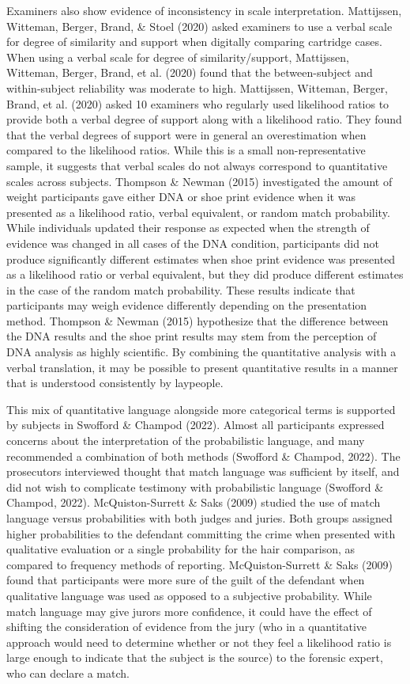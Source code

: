 \documentclass[print]{nuthesis}
\begin{document}
Examiners also show evidence of inconsistency in scale interpretation.
Mattijssen, Witteman, Berger, Brand, \& Stoel (2020) asked examiners to use a verbal scale for degree of similarity and support when digitally comparing cartridge cases.
When using a verbal scale for degree of similarity/support, Mattijssen, Witteman, Berger, Brand, et al. (2020) found that the between-subject and within-subject reliability was moderate to high.
Mattijssen, Witteman, Berger, Brand, et al. (2020) asked 10 examiners who regularly used likelihood ratios to provide both a verbal degree of support along with a likelihood ratio.
They found that the verbal degrees of support were in general an overestimation when compared to the likelihood ratios.
While this is a small non-representative sample, it suggests that verbal scales do not always correspond to quantitative scales across subjects.
Thompson \& Newman (2015) investigated the amount of weight participants gave either DNA or shoe print evidence when it was presented as a likelihood ratio, verbal equivalent, or random match probability.
While individuals updated their response as expected when the strength of evidence was changed in all cases of the DNA condition, participants did not produce significantly different estimates when shoe print evidence was presented as a likelihood ratio or verbal equivalent, but they did produce different estimates in the case of the random match probability.
These results indicate that participants may weigh evidence differently depending on the presentation method.
Thompson \& Newman (2015) hypothesize that the difference between the DNA results and the shoe print results may stem from the perception of DNA analysis as highly scientific.
By combining the quantitative analysis with a verbal translation, it may be possible to present quantitative results in a manner that is understood consistently by laypeople.

This mix of quantitative language alongside more categorical terms is supported by subjects in Swofford \& Champod (2022).
Almost all participants expressed concerns about the interpretation of the probabilistic language, and many recommended a combination of both methods (Swofford \& Champod, 2022).
The prosecutors interviewed thought that match language was sufficient by itself, and did not wish to complicate testimony with probabilistic language (Swofford \& Champod, 2022).
McQuiston-Surrett \& Saks (2009) studied the use of match language versus probabilities with both judges and juries.
Both groups assigned higher probabilities to the defendant committing the crime when presented with qualitative evaluation or a single probability for the hair comparison, as compared to frequency methods of reporting.
McQuiston-Surrett \& Saks (2009) found that participants were more sure of the guilt of the defendant when qualitative language was used as opposed to a subjective probability.
While match language may give jurors more confidence, it could have the effect of shifting the consideration of evidence from the jury (who in a quantitative approach would need to determine whether or not they feel a likelihood ratio is large enough to indicate that the subject is the source) to the forensic expert, who can declare a match.
\end{document}
